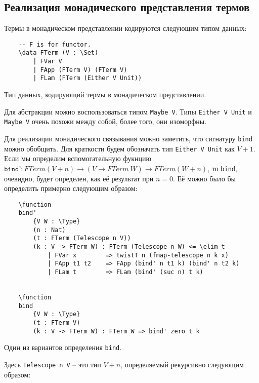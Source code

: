 \subsection{Реализация монадического представления термов}

Термы в монадическом представлении кодируются следующим типом данных:

\begin{listing}[H]
  \begin{verbatim}
    -- F is for functor.
    \data FTerm (V : \Set)
        | FVar V
        | FApp (FTerm V) (FTerm V)
        | FLam (FTerm (Either V Unit))
  \end{verbatim}
  \caption{Тип данных, кодирующий термы в монадическом представлении.}
\end{listing}

Для абстракции можно воспользоваться типом \texttt{Maybe V}. Типы \texttt{Either V Unit} и \texttt{Maybe V} очень похожи между собой, более того, они изоморфны.

Для реализации монадического связывания можно заметить, что сигнатуру \texttt{bind} можно обобщить. Для краткости будем обозначать тип \texttt{Either V Unit} как $V + 1$. Если мы определим вспомогательную фукнцию $\texttt{bind'} : FTerm (V + n) \to (V \to FTerm\ W) \to FTerm (W + n) $, то \texttt{bind}, очевидно, будет определен, как её результат при $n = 0$. Её можно было бы определить примерно следующим образом:

\begin{listing}[H]
  \begin{verbatim}
    \function
    bind'
        {V W : \Type}
        (n : Nat)
        (t : FTerm (Telescope n V))
        (k : V -> FTerm W) : FTerm (Telescope n W) <= \elim t
            | FVar x        => twistT n (fmap-telescope n k x)
            | FApp t1 t2    => FApp (bind' n t1 k) (bind' n t2 k)
            | FLam t        => FLam (bind' (suc n) t k)


    \function
    bind
        {V W : \Type}
        (t : FTerm V)
        (k : V -> FTerm W) : FTerm W => bind' zero t k
  \end{verbatim}
  \caption{Один из вариантов определения \texttt{bind}.}
\end{listing}

Здесь \texttt{Telescope n V} -- это тип $V + n$, определяемый рекурсивно следующим образом:

